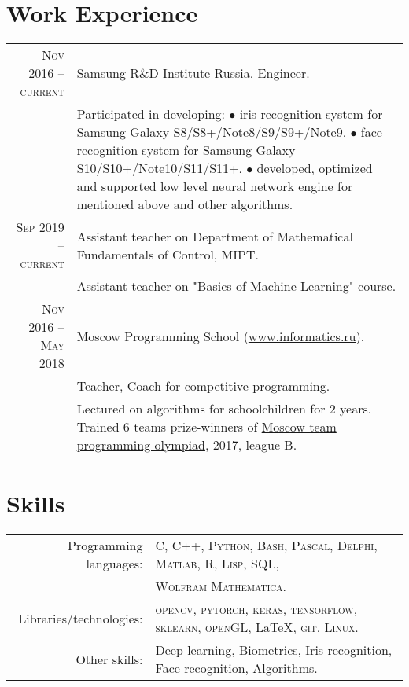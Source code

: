 \documentclass[a4paper,10pt]{article}
\begin{document}
\section{Work Experience}
\begin{tabular}{r|p{10.5cm}}
\textsc{Nov 2016} -- \textsc{current}  & Samsung R\&D Institute Russia. Engineer.\\
                                       & \parbox{10.5cm}{\small Participated in developing: \\
                                       $\bullet$ iris recognition system for Samsung Galaxy S8/S8+/Note8/S9/S9+/Note9. \\
                                       $\bullet$ face recognition system for Samsung Galaxy S10/S10+/Note10/S11/S11+. \\
                                       $\bullet$ developed, optimized and supported low level neural network engine for mentioned above and other algorithms.}
\\
\hline
\textsc{Sep 2019} -- \textsc{current}  & Assistant teacher on Department of Mathematical Fundamentals of Control, MIPT.\\
                                       & \parbox{10.5cm}{\small Assistant teacher on "Basics of Machine Learning" course.}
\\
\hline
\textsc{Nov 2016} -- \textsc{May 2018} & Moscow Programming School (\href{www.informatics.ru}{www.informatics.ru}). \\
                                       & Teacher, Coach for competitive programming.\\
                                       & \small Lectured on algorithms for schoolchildren for 2 years. Trained 6 teams prize-winners of \href{https://olympiads.ru/team/}{Moscow team programming olympiad}, 2017, league B.

\end{tabular}

\section{Skills}
\begin{tabular}{rl}
 Programming languages: & \textsc{C}, \textsc{C++}, \textsc{Python}, \textsc{Bash}, \textsc{Pascal}, \textsc{Delphi}, \textsc{Matlab}, \textsc{R}, \textsc{Lisp}, \textsc{SQL}, \\
                        & \textsc{Wolfram Mathematica}.\\
Libraries/technologies: & \textsc{opencv}, \textsc{pytorch}, \textsc{keras}, \textsc{tensorflow}, \textsc{sklearn}, \textsc{openGL}, \LaTeX, \textsc{git}, \textsc{Linux}.\\
Other skills: & Deep learning, Biometrics, Iris recognition, Face recognition, Algorithms.
\end{tabular}
\end{document}
